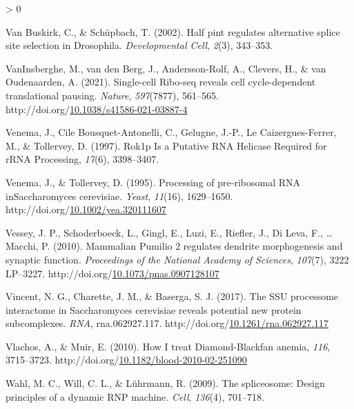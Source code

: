 \documentclass[12pt,oneside]{reedthesis}
\newlength{\cslhangindent}
\newenvironment{CSLReferences}[2] %
 {%
  \setlength{\parindent}{0pt}
  \ifodd #1 \everypar{\setlength{\hangindent}{\cslhangindent}}\ignorespaces\fi
  \ifnum #2 > 0
  \setlength{\parskip}{#2\baselineskip}
  \fi
 }%
 {}
\begin{document}
\begin{CSLReferences}{1}{0}
\leavevmode\hypertarget{ref-VanBuskirk2002}{}%
Van Buskirk, C., \& Schüpbach, T. (2002). Half pint regulates alternative splice site selection in {Drosophila}. \emph{Developmental Cell}, \emph{2}(3), 343--353.

\leavevmode\hypertarget{ref-vaninsbergheSinglecellRiboseqReveals2021}{}%
VanInsberghe, M., van den Berg, J., Andersson-Rolf, A., Clevers, H., \& van Oudenaarden, A. (2021). Single-cell {Ribo-seq} reveals cell cycle-dependent translational pausing. \emph{Nature}, \emph{597}(7877), 561--565. http://doi.org/\href{https://doi.org/10.1038/s41586-021-03887-4}{10.1038/s41586-021-03887-4}

\leavevmode\hypertarget{ref-Venema1997}{}%
Venema, J., Cile Bousquet-Antonelli, C., Gelugne, J.-P., Le Caizergues-Ferrer, M., \& Tollervey, D. (1997). Rok1p {Is} a {Putative RNA Helicase Required} for {rRNA Processing}, \emph{17}(6), 3398--3407.

\leavevmode\hypertarget{ref-venemaProcessingPreribosomalRNA1995}{}%
Venema, J., \& Tollervey, D. (1995). Processing of pre-ribosomal {RNA inSaccharomyces} cerevisiae. \emph{Yeast}, \emph{11}(16), 1629--1650. http://doi.org/\href{https://doi.org/10.1002/yea.320111607}{10.1002/yea.320111607}

\leavevmode\hypertarget{ref-Vessey2010b}{}%
Vessey, J. P., Schoderboeck, L., Gingl, E., Luzi, E., Riefler, J., Di Leva, F., \ldots{} Macchi, P. (2010). Mammalian {Pumilio} 2 regulates dendrite morphogenesis and synaptic function. \emph{Proceedings of the National Academy of Sciences}, \emph{107}(7), 3222 LP--3227. http://doi.org/\href{https://doi.org/10.1073/pnas.0907128107}{10.1073/pnas.0907128107}

\leavevmode\hypertarget{ref-vincentSSUProcessomeInteractome2017}{}%
Vincent, N. G., Charette, J. M., \& Baserga, S. J. (2017). The {SSU} processome interactome in {Saccharomyces} cerevisiae reveals potential new protein subcomplexes. \emph{RNA}, rna.062927.117. http://doi.org/\href{https://doi.org/10.1261/rna.062927.117}{10.1261/rna.062927.117}

\leavevmode\hypertarget{ref-Vlachos2010a}{}%
Vlachos, A., \& Muir, E. (2010). How {I} treat {Diamond-Blackfan} anemia, \emph{116}, 3715--3723. http://doi.org/\href{https://doi.org/10.1182/blood-2010-02-251090}{10.1182/blood-2010-02-251090}

\leavevmode\hypertarget{ref-Wahl2009}{}%
Wahl, M. C., Will, C. L., \& Lührmann, R. (2009). The spliceosome: Design principles of a dynamic {RNP} machine. \emph{Cell}, \emph{136}(4), 701--718.


\end{CSLReferences}
\end{document}
